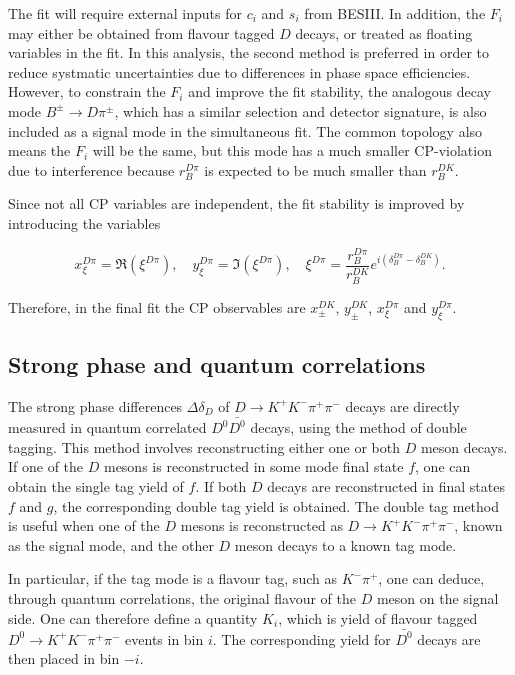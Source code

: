 \documentclass[12pt, a4paper, notitlepage, onecolumn]{article}
\numberwithin{equation}{section}
\begin{document}
The fit will require external inputs for $c_i$ and $s_i$ from BESIII. In addition, the $F_i$ may either be obtained from flavour tagged $D$ decays, or treated as floating variables in the fit. In this analysis, the second method is preferred in order to reduce systmatic uncertainties due to differences in phase space efficiencies. However, to constrain the $F_i$ and improve the fit stability, the analogous decay mode $B^\pm\to D\pi^\pm$, which has a similar selection and detector signature, is also included as a signal mode in the simultaneous fit. The common topology also means the $F_i$ will be the same, but this mode has a much smaller CP-violation due to interference because $r_B^{D\pi}$ is expected to be much smaller than $r_B^{DK}$.

Since not all CP variables are independent, the fit stability is improved by introducing the variables

\begin{equation}
  x_\xi^{D\pi} = \Re(\xi^{D\pi}), \quad y_\xi^{D\pi} = \Im(\xi^{D\pi}), \quad \xi^{D\pi} = \frac{r_B^{D\pi}}{r_B^{DK}}e^{i(\delta_B^{D\pi} - \delta_B^{DK})}.
\end{equation}

Therefore, in the final fit the CP observables are $x_\pm^{DK}$, $y_\pm^{DK}$, $x_\xi^{D\pi}$ and $y_\xi^{D\pi}$.

\subsection{Strong phase and quantum correlations}
The strong phase differences $\Delta\delta_D$ of $D\to K^+K^-\pi^+\pi^-$ decays are directly measured in quantum correlated $D^0\bar{D^0}$ decays, using the method of double tagging. This method involves reconstructing either one or both $D$ meson decays. If one of the $D$ mesons is reconstructed in some mode final state $f$, one can obtain the single tag yield of $f$. If both $D$ decays are reconstructed in final states $f$ and $g$, the corresponding double tag yield is obtained. The double tag method is useful when one of the $D$ mesons is reconstructed as $D\to K^+K^-\pi^+\pi^-$, known as the signal mode, and the other $D$ meson decays to a known tag mode.

In particular, if the tag mode is a flavour tag, such as $K^-\pi^+$, one can deduce, through quantum correlations, the original flavour of the $D$ meson on the signal side. One can therefore define a quantity $K_i$, which is yield of flavour tagged $D^0\to K^+K^-\pi^+\pi^-$ events in bin $i$. The corresponding yield for $\bar{D^0}$ decays are then placed in bin $-i$.
\end{document}
